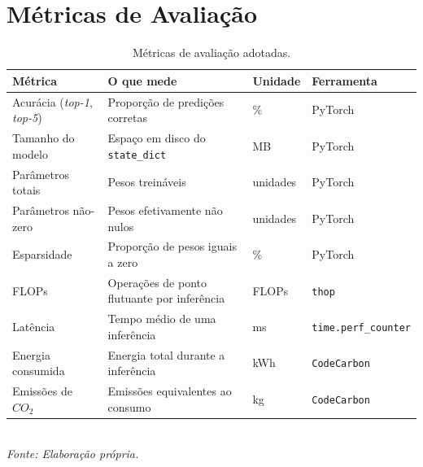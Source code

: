 \section{Métricas de Avaliação}\label{sec:metricas}


\begin{table}[htb]
\centering
\caption{Métricas de avaliação adotadas.}
\label{tab:metricas}
\small
\begin{tabular}{p{3.5cm}p{4.5cm}p{2cm}p{2.5cm}}
\hline
\textbf{Métrica} & \textbf{O que mede} & \textbf{Unidade} & \textbf{Ferramenta} \\
\hline
Acurácia (\textit{top-1}, \textit{top-5}) & Proporção de predições corretas & \% & PyTorch \\
Tamanho do modelo & Espaço em disco do \texttt{state\_dict} & MB & PyTorch \\
Parâmetros totais & Pesos treináveis & unidades & PyTorch \\
Parâmetros não-zero & Pesos efetivamente não nulos & unidades & PyTorch \\
Esparsidade & Proporção de pesos iguais a zero & \% & PyTorch \\
FLOPs & Operações de ponto flutuante por inferência & FLOPs & \texttt{thop} \\
Latência & Tempo médio de uma inferência & ms & \texttt{time.perf\_counter} \\
Energia consumida & Energia total durante a inferência & kWh & \texttt{CodeCarbon} \\
Emissões de $CO_2$ & Emissões equivalentes ao consumo & kg & \texttt{CodeCarbon} \\
\hline
\end{tabular}\\
\textit{Fonte: Elaboração própria.}
\end{table}


